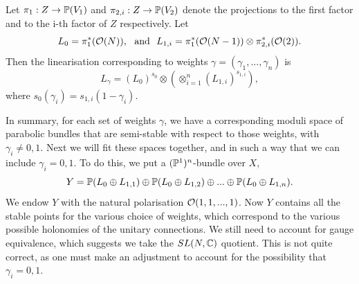 	
	Let $\pi_1:Z \to \mathbb{P}(V_1)$ and $\pi_{2,i}:Z\to \mathbb{P}(V_2)$ denote the projections to the first factor and to the i-th factor of $Z$ respectively. Let
	\begin{equation}
		L_0 = \pi_1^\ast(\mathcal{O}(N)),~ \text{ and } ~ L_{1,i} = \pi_1^\ast(\mathcal{O}(N-1))\otimes \pi_{2,i}^\ast (\mathcal{O}(2)).
	\end{equation}
	Then the linearisation corresponding to weights $\gamma = (\gamma_1,...,\gamma_n)$ is 
	\begin{equation}
		L_\gamma = (L_0)^{s_0} \otimes \left(
		\otimes_{i=1}^n (L_{1,i})^{s_{1,i}}
		\right),
	\end{equation}
	where $s_0(\gamma_i) = s_{1,i}(1-\gamma_i)$.
	
	In summary, for each set of weights $\gamma$, we have a corresponding moduli space of parabolic bundles that are semi-stable with respect to those weights, with $\gamma_i \neq 0,1$. Next we will fit these spaces together, and in such a way that we can include $\gamma_i = 0,1$. To do this, we put a $(\mathbb{P}^1)^n$-bundle over $X$,
	\begin{equation}
		Y = \mathbb{P}(L_0\oplus L_{1,1})\oplus \mathbb{P}(L_0\oplus L_{1,2})\oplus ... \oplus \mathbb{P}(L_0\oplus L_{1,n}).
	\end{equation}
	We endow $Y$ with the natural polarisation $\mathcal{O}(1,1,...,1)$. Now $Y$ contains all the stable points for the various choice of weights, which correspond to the various possible holonomies of the unitary connections. We still need to account for gauge equivalence, which suggests we take the $SL(N,\mathbb{C})$ quotient. This is not quite correct, as one must make an adjustment to account for the possibility that $\gamma_i = 0,1$.
	
